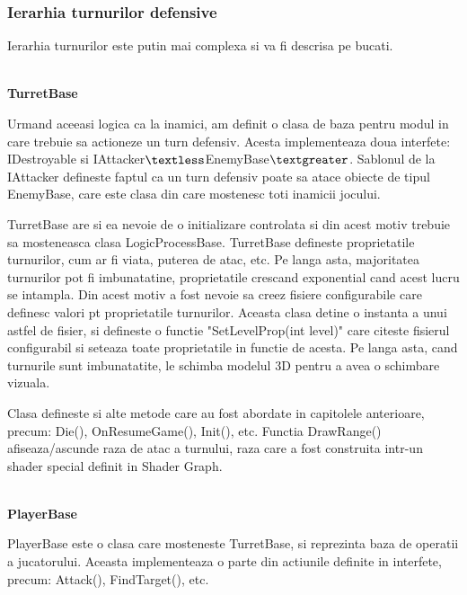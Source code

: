 \documentclass[12pt, a4paper]{article}
\begin{document}
	
	
	
	
	\subsubsection{Ierarhia turnurilor defensive}
	\label{section: turretHierachy}
	
	Ierarhia turnurilor este putin mai complexa si va fi descrisa pe bucati.
	
	\ \\
	\textbf{TurretBase}
	
	Urmand aceeasi logica ca la inamici, am definit o clasa de baza pentru modul in care trebuie sa actioneze un turn defensiv. Acesta implementeaza doua interfete: IDestroyable si IAttacker$\textless$EnemyBase$\textgreater$. Sablonul de la IAttacker defineste faptul ca un turn defensiv poate sa atace obiecte de tipul EnemyBase, care este clasa din care mostenesc toti inamicii jocului.
	\newline
	
	TurretBase are si ea nevoie de o initializare controlata si din acest motiv trebuie sa mosteneasca clasa LogicProcessBase. TurretBase defineste proprietatile turnurilor, cum ar fi viata, puterea de atac, etc. Pe langa asta, majoritatea turnurilor pot fi imbunatatine, proprietatile crescand exponential cand acest lucru se intampla. Din acest motiv a fost nevoie sa creez fisiere configurabile care definesc valori pt proprietatile turnurilor. Aceasta clasa detine o instanta a unui astfel de fisier, si defineste o functie "SetLevelProp(int level)" care citeste fisierul configurabil si seteaza toate proprietatile in functie de acesta. Pe langa asta, cand turnurile sunt imbunatatite, le schimba modelul 3D pentru a avea o schimbare vizuala.
	\newline
	
	Clasa defineste si alte metode care au fost abordate in capitolele anterioare, precum: Die(), OnResumeGame(), Init(), etc. Functia DrawRange() afiseaza/ascunde raza de atac a turnului, raza care a fost construita intr-un shader special definit in Shader Graph.
	
	\ \\
	\textbf{PlayerBase}
	
	PlayerBase este o clasa care mosteneste TurretBase, si reprezinta baza de operatii a jucatorului. Aceasta implementeaza o parte din actiunile definite in interfete, precum: Attack(), FindTarget(), etc.
	\newline
	
\end{document}
